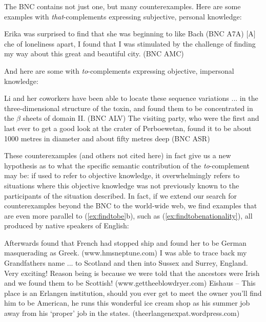 The BNC contains not just one, but many counterexamples. Here are some examples with \textit{that}-complements expressing subjective, personal knowledge:

\begin{exe}
\ex
\begin{xlist} 
\label{ex:findthatsubjective}
\ex Erika was surprised to find that she was beginning to like Bach (BNC A7A)
\ex $[$A$]$che of loneliness apart, I found that I was stimulated by the challenge of finding my way about this great and beautiful city. (BNC AMC)
\end{xlist}
\end{exe}

And here are some with \textit{to}-complements expressing objective, impersonal knowledge:

\begin{exe}
\ex
\begin{xlist} 
\label{ex:findtobefact}
\ex Li and her coworkers have been able to locate these sequence variations ... in the three-dimensional structure of the toxin, and found them to be concentrated in the $\beta$ sheets of domain II. (BNC ALV)
\ex The visiting party, who were the first and last ever to get a good look at the crater of Perboewetan, found it to be about \num{1000} metres in diameter and about fifty metres deep (BNC ASR)
\end{xlist}
\end{exe}

These counterexamples (and others not cited here) in fact give us a new hypothesis as to what the specific semantic contribution of the \textit{to}-complement may be: if used to refer to objective knowledge, it overwhelmingly refers to situations where this objective knowledge was not previously known to the participants of the situation described. In fact, if we extend our search for counterexamples beyond the BNC to the world-wide web, we find examples that are even more parallel to (\ref{ex:findtobe}b), such as (\ref{ex:findtobenationality}), all produced by native speakers of English:

\begin{exe}
\ex
\begin{xlist} 
\label{ex:findtobenationality}
\ex Afterwards found that French had stopped ship and found her to be German masquerading as Greek. (www.hmsneptune.com)
\ex I was able to trace back my Grandfathers name ... to Scotland and then into Sussex and Surrey, England. Very exciting! Reason being is because we were told that the ancestors were Irish and we found them to be Scottish! (www.gettheeblowdryer.com)
\ex Eishaus -- This place is an Erlangen institution, should you ever get to meet the owner you'll find him to be American, he runs this wonderful ice cream shop as his summer job away from his `proper' job in the states. (theerlangenexpat.wordpress.com)
\end{xlist}
\end{exe}

